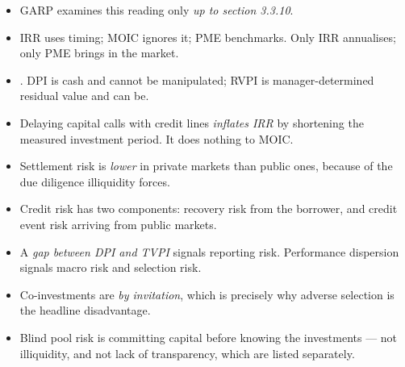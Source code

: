 \begin{imtrapbox}[title={Consolidated trap summary --- IM-11}]
\begin{itemize}
\item {} GARP examines this reading only \emph{up to section 3.3.10}.
\item {} IRR uses timing; MOIC ignores it; PME benchmarks.
Only IRR annualises; only PME brings in the market.
\item {} . DPI is cash and
cannot be manipulated; RVPI is manager-determined residual value and can be.
\item {} Delaying capital calls with credit lines \emph{inflates
IRR} by shortening the measured investment period. It does nothing to MOIC.
\item {} Settlement risk is \emph{lower} in private markets
than public ones, because of the due diligence illiquidity forces.
\item {} Credit risk has two components: recovery risk from
the borrower, and credit event risk arriving from public markets.
\item {} A \emph{gap between DPI and TVPI} signals
reporting risk. Performance dispersion signals macro risk and selection risk.
\item {} Co-investments are \emph{by invitation}, which is
precisely why adverse selection is the headline disadvantage.
\item {} Blind pool risk is committing capital before
knowing the investments --- not illiquidity, and not lack of transparency, which
are listed separately.
\end{itemize}
\end{imtrapbox}

